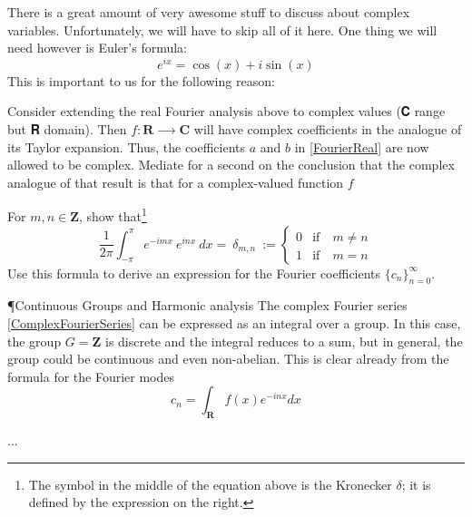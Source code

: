 There is a great amount of very awesome stuff to discuss about complex variables. Unfortunately, we will have to skip all of it here. One thing we will need however is Euler's formula:
$$
e^{ix} = \cos (x) + i \sin (x)
$$
This is important to us for the following reason:

Consider extending the real Fourier analysis above to complex values (𝐂 range but 𝐑 domain). Then $f : 𝐑 ⟶ 𝐂$ will have complex coefficients in the analogue of its Taylor expansion. Thus, the coefficients $a$ and $b$ in \eqref{FourierReal} are now allowed to be complex. 
Mediate for a second on the conclusion that the complex analogue of that result is that for a complex-valued function $f$

\begin{exercise} 
For $m, n ∈ 𝐙$, show that\footnote{The symbol in the middle of the equation above is the Kronecker $δ$; it is defined by the expression on the right. }
$$
\frac{1}{2π} \int_{-π}^π  e^{- i m x}\ e^{inx}\ dx =\ δ_{m,n}\ :=  \begin{cases} 
		0 & \textrm{if}\quad m≠ n\\
		1 & \textrm{if}\quad m = n
	\end{cases} 
$$	
Use this formula to derive an expression for the Fourier coefficients $\{c_n\}_{n=0}^∞$.
\end{exercise} 


¶{Continuous Groups and Harmonic analysis}
The complex Fourier series \eqref{ComplexFourierSeries} can be expressed as an integral over a group. In this case, the group $G=𝐙$ is discrete and the integral reduces to a sum, but in general, the group could be continuous and even non-abelian. 
This is clear already from the formula for the Fourier modes 
$$
c_n = \int_{𝐑} f(x) e^{-i n x} dx
$$

...








  